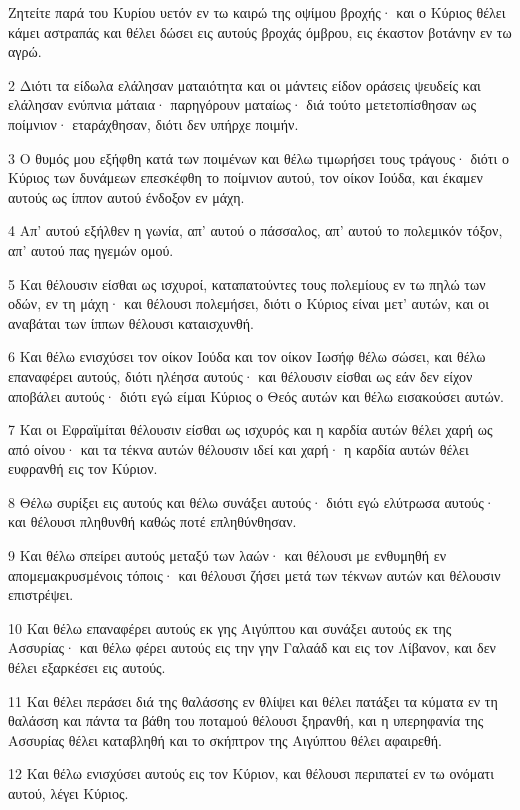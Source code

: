 \par Ζητείτε παρά του Κυρίου υετόν εν τω καιρώ της οψίμου βροχής· και ο Κύριος θέλει κάμει αστραπάς και θέλει δώσει εις αυτούς βροχάς όμβρου, εις έκαστον βοτάνην εν τω αγρώ.
\par 2 Διότι τα είδωλα ελάλησαν ματαιότητα και οι μάντεις είδον οράσεις ψευδείς και ελάλησαν ενύπνια μάταια· παρηγόρουν ματαίως· διά τούτο μετετοπίσθησαν ως ποίμνιον· εταράχθησαν, διότι δεν υπήρχε ποιμήν.
\par 3 Ο θυμός μου εξήφθη κατά των ποιμένων και θέλω τιμωρήσει τους τράγους· διότι ο Κύριος των δυνάμεων επεσκέφθη το ποίμνιον αυτού, τον οίκον Ιούδα, και έκαμεν αυτούς ως ίππον αυτού ένδοξον εν μάχη.
\par 4 Απ' αυτού εξήλθεν η γωνία, απ' αυτού ο πάσσαλος, απ' αυτού το πολεμικόν τόξον, απ' αυτού πας ηγεμών ομού.
\par 5 Και θέλουσιν είσθαι ως ισχυροί, καταπατούντες τους πολεμίους εν τω πηλώ των οδών, εν τη μάχη· και θέλουσι πολεμήσει, διότι ο Κύριος είναι μετ' αυτών, και οι αναβάται των ίππων θέλουσι καταισχυνθή.
\par 6 Και θέλω ενισχύσει τον οίκον Ιούδα και τον οίκον Ιωσήφ θέλω σώσει, και θέλω επαναφέρει αυτούς, διότι ηλέησα αυτούς· και θέλουσιν είσθαι ως εάν δεν είχον αποβάλει αυτούς· διότι εγώ είμαι Κύριος ο Θεός αυτών και θέλω εισακούσει αυτών.
\par 7 Και οι Εφραϊμίται θέλουσιν είσθαι ως ισχυρός και η καρδία αυτών θέλει χαρή ως από οίνου· και τα τέκνα αυτών θέλουσιν ιδεί και χαρή· η καρδία αυτών θέλει ευφρανθή εις τον Κύριον.
\par 8 Θέλω συρίξει εις αυτούς και θέλω συνάξει αυτούς· διότι εγώ ελύτρωσα αυτούς· και θέλουσι πληθυνθή καθώς ποτέ επληθύνθησαν.
\par 9 Και θέλω σπείρει αυτούς μεταξύ των λαών· και θέλουσι με ενθυμηθή εν απομεμακρυσμένοις τόποις· και θέλουσι ζήσει μετά των τέκνων αυτών και θέλουσιν επιστρέψει.
\par 10 Και θέλω επαναφέρει αυτούς εκ γης Αιγύπτου και συνάξει αυτούς εκ της Ασσυρίας· και θέλω φέρει αυτούς εις την γην Γαλαάδ και εις τον Λίβανον, και δεν θέλει εξαρκέσει εις αυτούς.
\par 11 Και θέλει περάσει διά της θαλάσσης εν θλίψει και θέλει πατάξει τα κύματα εν τη θαλάσση και πάντα τα βάθη του ποταμού θέλουσι ξηρανθή, και η υπερηφανία της Ασσυρίας θέλει καταβληθή και το σκήπτρον της Αιγύπτου θέλει αφαιρεθή.
\par 12 Και θέλω ενισχύσει αυτούς εις τον Κύριον, και θέλουσι περιπατεί εν τω ονόματι αυτού, λέγει Κύριος.

